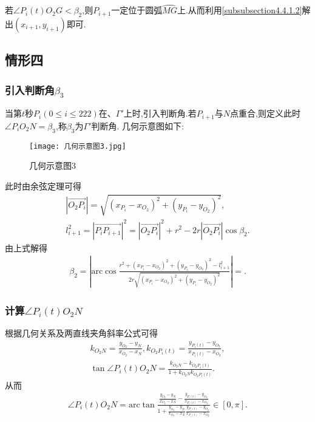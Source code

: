 \documentclass[lang=cn,newtx,10pt,scheme=chinese]{../Template/elegantbook}
\begin{document}
若$\angle P_i(t)O_2G< \beta_2$,则$P_{i+1}$一定位于圆弧$\wideparen{MG}$上.从而利用\eqref{subsubsection4.4.1.2}解出$(x_{i+1},y_{i+1})$即可.

\subsection{情形四}

\subsubsection{引入判断角$\beta_3$}

当第$t$秒$P_i(0\leq i\leq 222)$在$、\varGamma'$上时,引入判断角.若$P_{i+1}$与$N$点重合,则定义此时$\angle P_iO_2N=\beta_3$,称$\beta_3$为$\varGamma'$判断角. 几何示意图如下:
\begin{figure}[htbp]
\centering
\texttt{[image: 几何示意图3.jpg]}
\caption{几何示意图3}
\label{figure4}
\end{figure}
此时由余弦定理可得
\begin{gather}
\left| \overrightarrow{O_2P_i} \right|=\sqrt{\left( x_{P_i}-x_{O_2} \right) ^2+\left( y_{P_i}-y_{O_2} \right) ^2},
\\
l_{i+1}^{2}=\left| \overrightarrow{P_iP_{i+1}} \right|^2=\left| \overrightarrow{O_2P_i} \right|^2+r^2-2r\left| \overrightarrow{O_2P_i} \right|\cos \beta _2.
\end{gather}
由上式解得
\begin{align}
\beta _2=\left| \mathrm{arc}\cos \frac{r^2+\left( x_{P_i}-x_{O_2} \right) ^2+\left( y_{P_i}-y_{O_2} \right) ^2-l_{i+1}^{2}}{2r\sqrt{\left( x_{P_i}-x_{O_2} \right) ^2+\left( y_{P_i}-y_{O_2} \right) ^2}} \right|=.
\end{align}


\subsubsection{计算$\angle P_{i}(t)O_2N$}

根据几何关系及两直线夹角斜率公式可得
\begin{gather}
k_{O_2N}=\frac{y_{O_2}-y_N}{x_{O_2}-x_N},k_{O_2P_i\left( t \right)}=\frac{y_{P_i\left( t \right)}-y_{O_2}}{x_{P_i\left( t \right)}-x_{O_2}},
\\
\tan \angle P_i(t)O_2N=\frac{k_{O_2N}-k_{O_2P_i\left( t \right)}}{1+k_{O_2N}k_{O_2P_i\left( t \right)}}.
\end{gather}
从而
\begin{align}
\angle P_i(t)O_2N=\mathrm{arc}\tan \frac{\frac{y_{O_2}-y_N}{x_{O_2}-x_N}-\frac{y_{P_i\left( t \right)}-y_{O_2}}{x_{P_i\left( t \right)}-x_{O_2}}}{1+\frac{y_{O_2}-y_N}{x_{O_2}-x_N}\frac{y_{P_i\left( t \right)}-y_{O_2}}{x_{P_i\left( t \right)}-x_{O_2}}}\in \left[ 0,\pi \right] .
\end{align}
\end{document}
